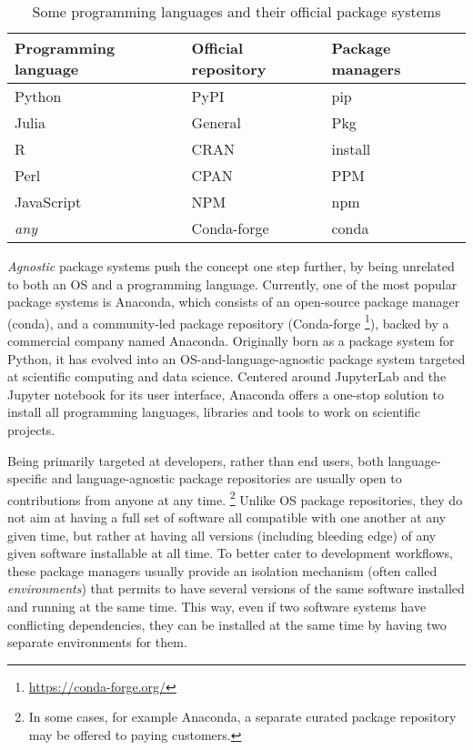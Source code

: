 \documentclass{deliverablereport}
\begin{document}
\begin{table}
  \centering
  \begin{tabular}{l | l | l}
    Programming language & Official repository & Package managers\\
    \hline
    Python & PyPI & pip\\
    Julia & General & Pkg\\
    R & CRAN & install\\
    Perl & CPAN & PPM\\
    JavaScript & NPM & npm \\
    \emph{any} & Conda-forge & conda
  \end{tabular}
  \caption{Some programming languages and their official package systems}
  \label{tab:pkg-lang}
\end{table}

\emph{Agnostic} package systems push the concept one step further, by
being unrelated to both an OS and a programming language. %
Currently, one of the most popular package systems is Anaconda, which
consists of an open-source package manager (conda), and a
community-led package repository (Conda-forge%
\footnote{\url{https://conda-forge.org/}}), %
backed by a commercial company named Anaconda. %
Originally born as a package system for Python, it has evolved into an
OS-and-language-agnostic package system targeted at scientific
computing and data science. %
Centered around JupyterLab and the Jupyter notebook for its user
interface, Anaconda offers a one-stop solution to install all
programming languages, libraries and tools to work on scientific
projects.

Being primarily targeted at developers, rather than end users, both
language-specific and language-agnostic package repositories are
usually open to contributions from anyone at any time.%
\footnote{In some cases, for example Anaconda, a separate curated package
  repository may be offered to paying customers.} %
Unlike OS package repositories, they do not aim at having a full set
of software all compatible with one another at any given time, but
rather at having all versions (including bleeding edge) of any given
software installable at all time. %
To better cater to development workflows, these package managers
usually provide an isolation mechanism (often called
\emph{environments}) that permits to have several versions of the same
software installed and running at the same time. %
This way, even if two software systems have conflicting dependencies, they can
be installed at the same time by having two separate environments for
them.
\end{document}
